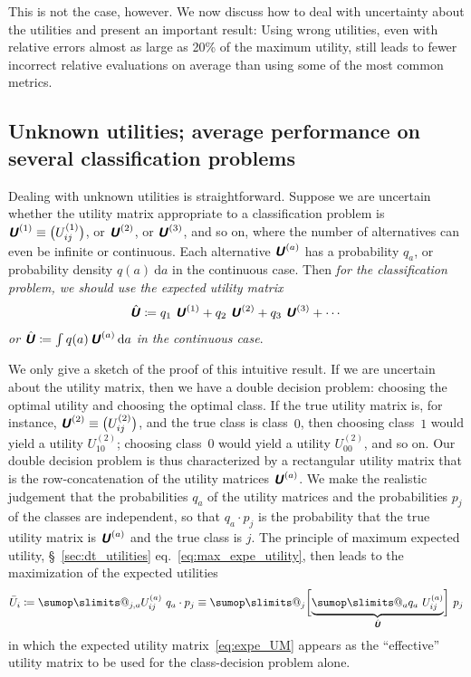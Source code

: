 \documentclass[\ifafour a4paper,12pt,\else a5paper,10pt,\fi%
onecolumn,oneside,article,%
british%
]{memoir}
\makeatletter
\theoremstyle{remark}
\theoremstyle{innote}
\def\sum{\DOTSI\sumop\slimits@}
\newcommand*{\mathte}[1]{\textbf{\textit{\textsf{#1}}}}
\newcommand*{\di}{\mathrm{d}}%
\newcommand*{\defd}{\coloneqq}
\renewcommand*{\|}[1][]{\nonscript\:#1\vert\nonscript\:\mathopen{}}
\newcommand*{\sect}{\S}%
\newcommand*{\eqn}{eq.}%
\newcommand*{\myhat}[1]{{\mkern1.5mu\skew{2}\hat{\mkern-1.5mu#1\mkern-1.5mu}\mkern 1.5mu}}
\newcommand*{\eu}{\bar{U}}
\newcommand*{\aveu}{\myhat{\mathte{U}}}
\newcommand*{\uncu}[1]{\mathte{U}^{(#1)}}
\makeatother
\begin{document}
This is not the case, however. We now discuss how to deal with uncertainty about the utilities and present an important result: Using wrong utilities, even with relative errors almost as large as 20\% of the maximum utility, still leads to fewer incorrect relative evaluations on average than using some of the most common metrics.

\subsection{Unknown utilities; average performance on several classification problems}
\label{sec:unknown_utilities}

Dealing with unknown utilities is straightforward. Suppose we are uncertain whether the utility matrix appropriate to a classification problem is $\uncu{1} \equiv \bigl(U^{(1)}_{ij}\bigr)$, or $\uncu{2}$, or $\uncu{3}$, and so on, where the number of alternatives can even be infinite or continuous. Each alternative $\uncu{a}$ has a probability $q_a$, or probability density $q(a)\ \di a$ in the continuous case. Then \emph{for the classification problem, we should use the expected utility matrix
  \begin{equation}
    \label{eq:expe_UM}
    \aveu \defd q_{1}\ \uncu{1} + q_{2}\ \uncu{2} + q_{3}\ \uncu{3} + \dotsb
  \end{equation}
  or $\aveu \defd \int q(a)\, \uncu{a}\, \di a$ in the continuous case}.

We only give a sketch of the proof of this intuitive result. If we are uncertain about the utility matrix, then we have a double decision problem: choosing the optimal utility and choosing the optimal class. If the true utility matrix is, for instance, $\uncu{2} \equiv \bigl(U^{(2)}_{ij}\bigr)$, and the true class is class~$0$, then choosing class~$1$ would yield a utility $U^{(2)}_{10}$; choosing class~$0$ would yield a utility $U^{(2)}_{00}$, and so on. Our double decision problem is thus characterized by a rectangular utility matrix that is the row-concatenation of the utility matrices $\uncu{a}$. We make the realistic judgement that the probabilities $q_{a}$ of the utility matrices and the probabilities $p_{j}$ of the classes are independent, so that $q_{a}\cdot p_{j}$ is the probability that the true utility matrix is $\uncu{a}$ and the true class is $j$. The principle of maximum expected utility, \sect~\ref{sec:dt_utilities} \eqn~\eqref{eq:max_expe_utility}, then leads to the maximization of the expected utilities
\begin{equation}
  \label{eq:average_expe_utility}
  \eu_{i} \defd \sum_{j,a} U^{(a)}_{ij}\ q_{a}\cdot p_{j}
  \equiv \sum_{j} \biggl[\underbrace{\sum_{a} q_{a}\ U^{(a)}_{ij}}_{\aveu} \biggr]\ p_{j}
\end{equation}
in which the expected utility matrix~\eqref{eq:expe_UM} appears as the \enquote{effective} utility matrix to be used for the class-decision problem alone.
\end{document}

